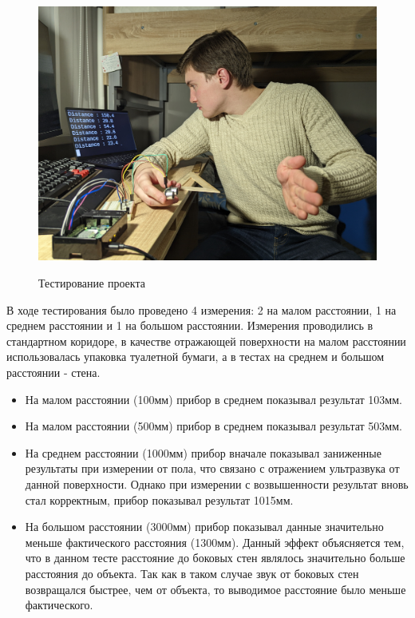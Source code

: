 \documentclass[a4paper, 14pt]{article}
\begin{document}
\begin{figure}[H]
	\centering
	\includegraphics[width=15cm]{screenshots/12.png}\\
	\caption{Тестирование проекта}
\end{figure}

В ходе тестирования было проведено 4 измерения: 2 на малом расстоянии, 1 на среднем расстоянии и 1 
на большом расстоянии. Измерения проводились в стандартном коридоре, в качестве отражающей поверхности на малом расстоянии использовалась упаковка туалетной бумаги, а в тестах на среднем
и большом расстоянии - стена.

\begin{itemize}
    \item На малом расстоянии (100мм) прибор в среднем показывал результат 103мм.
    \item На малом расстоянии (500мм) прибор в среднем показывал результат 503мм.
    \item На среднем расстоянии (1000мм) прибор вначале показывал заниженные результаты при измерении от пола, что связано с отражением ультразвука от данной поверхности. Однако при измерении с возвышенности результат вновь стал корректным, прибор показывал результат 1015мм.
    \item На большом расстоянии (3000мм) прибор показывал данные значительно меньше фактического расстояния (1300мм). Данный эффект объясняется тем, что в данном тесте расстояние до боковых стен являлось значительно больше расстояния до объекта. Так как в таком случае звук от боковых стен возвращался быстрее, чем от объекта, то выводимое расстояние было меньше фактического.
\end{itemize}
\end{document}
